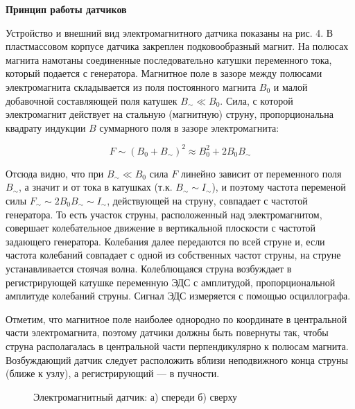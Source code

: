 \documentclass[14pt]{article}
\begin{document}
\vspace{1cm}
\textbf{Принцип работы датчиков}

Устройство и внешний вид электромагнитного датчика показаны на рис. 4. В пластмассовом корпусе датчика закреплен подковообразный магнит. На полюсах магнита намотаны соединенные последовательно катушки переменного тока, который подается с генератора. Магнитное поле в зазоре между полюсами электромагнита складывается из поля постоянного магнита $B_0$ и малой добавочной составляющей поля катушек $B_\sim \ll B_0$. Сила, с которой электромагнит действует на стальную (магнитную) струну, пропорциональна квадрату индукции $B$ суммарного поля в зазоре электромагнита:

$$F \sim (B_0 + B_\sim)^2 \approx B_0^2 + 2B_0 B_\sim$$

\noindent Отсюда видно, что при $B_\sim \ll B_0$ сила $F$ линейно зависит от переменного поля $B_\sim$, а значит и от тока в катушках (т.к. 
$B_\sim \sim I_\sim$), и поэтому частота переменой силы $F_\sim \sim 2B_0B_\sim \sim I_\sim$, действующей на струну, совпадает с частотой генератора. То есть участок струны, расположенный над электромагнитом, совершает колебательное движение в вертикальной плоскости с частотой задающего генератора. Колебания далее передаются по всей струне и, если частота колебаний совпадает с одной из собственных частот струны, на
струне устанавливается стоячая волна. Колеблющаяся струна возбуждает в регистрирующей катушке переменную ЭДС с амплитудой, пропорциональной амплитуде колебаний струны. Сигнал ЭДС измеряется с помощью осциллографа.

Отметим, что магнитное поле наиболее однородно по координате в центральной части электромагнита, поэтому датчики должны быть повернуты так, чтобы струна располагалась в центральной части перпендикулярно к полюсам магнита. Возбуждающий датчик следует расположить вблизи неподвижного конца струны (ближе к узлу), а регистрирующий — в пучности.

\begin{figure}[h!]
	\caption{Электромагнитный датчик: а) спереди б) сверху}
	\label{fig:image}
\end{figure}
\end{document}

